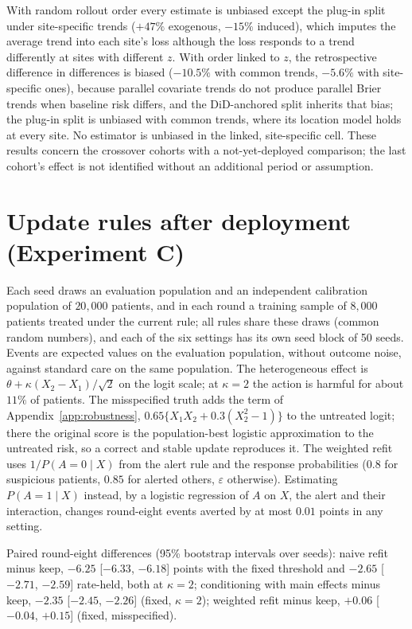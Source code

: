 \documentclass[letterpaper]{article} %
\begin{document}

With random rollout order every estimate is unbiased except the plug-in split
under site-specific trends ($+47\%$ exogenous, $-15\%$ induced), which imputes
the average trend into each site's loss although the loss responds to a trend
differently at sites with different $z$. With order linked to $z$, the
retrospective difference in differences is biased ($-10.5\%$ with common
trends, $-5.6\%$ with site-specific ones), because parallel covariate trends do
not produce parallel Brier trends when baseline risk differs, and the
DiD-anchored split inherits that bias; the plug-in split is unbiased with
common trends, where its location model holds at every site. No estimator is
unbiased in the linked, site-specific cell. These results concern the
crossover cohorts with a not-yet-deployed comparison; the last cohort's effect
is not identified without an additional period or assumption.

\section{Update rules after deployment (Experiment C)}
\label{app:retrain}
Each seed draws an evaluation population and an independent calibration
population of $20{,}000$ patients, and in each round a training sample of
$8{,}000$ patients treated under the current rule; all rules share these draws
(common random numbers), and each of the six settings has its own seed block
of 50 seeds. Events are expected values on the evaluation population, without
outcome noise, against standard care on the same population. The
heterogeneous effect is $\theta + \kappa (X_2 - X_1)/\sqrt{2}$ on the logit
scale; at $\kappa = 2$ the action is harmful for about $11\%$ of patients. The
misspecified truth adds the term of Appendix~\ref{app:robustness}, $0.65\{X_1X_2 + 0.3(X_2^2 - 1)\}$ to the
untreated logit; there the original score is the population-best logistic
approximation to the untreated risk, so a correct and stable update
reproduces it. The weighted refit uses $1/P(A = 0 \mid X)$ from the alert rule
and the response probabilities ($0.8$ for suspicious patients, $0.85$ for
alerted others, $\varepsilon$ otherwise). Estimating $P(A = 1 \mid X)$ instead,
by a logistic regression of $A$ on $X$, the alert and their interaction, changes
round-eight events averted by at most $0.01$ points in any setting.


Paired round-eight differences (95\% bootstrap intervals over seeds): naive
refit minus keep, $-6.25$ [$-6.33$, $-6.18$] points with the fixed threshold
and $-2.65$ [$-2.71$, $-2.59$] rate-held, both at $\kappa = 2$; conditioning
with main effects minus keep, $-2.35$ [$-2.45$, $-2.26$] (fixed, $\kappa = 2$);
weighted refit minus keep, $+0.06$ [$-0.04$, $+0.15$] (fixed, misspecified).
\end{document}

